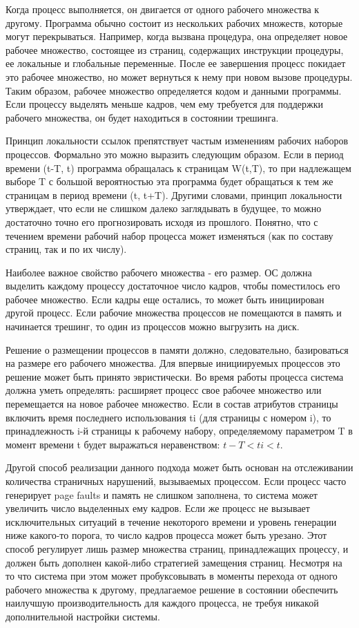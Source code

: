 Когда процесс выполняется, он двигается от одного рабочего множества к другому. Программа обычно состоит из нескольких рабочих множеств, которые могут перекрываться. Hапример, когда вызвана процедура, она определяет новое рабочее множество, состоящее из страниц, содержащих инструкции процедуры, ее локальные и глобальные переменные. После ее завершения процесс покидает это рабочее множество, но может вернуться к нему при новом вызове процедуры. Таким образом, рабочее множество определяется кодом и данными программы. Если процессу выделять меньше кадров, чем ему требуется для поддержки рабочего множества, он будет находиться в состоянии трешинга.

Принцип локальности ссылок препятствует частым изменениям рабочих наборов процессов. Формально это можно выразить следующим образом. Если в период времени (t-T, t) программа обращалась к страницам W(t,T), то при надлежащем выборе T с большой вероятностью эта программа будет обращаться к тем же страницам в период времени (t, t+T). Другими словами, принцип локальности утверждает, что если не слишком далеко заглядывать в будущее, то можно достаточно точно его прогнозировать исходя из прошлого. Понятно, что с течением времени рабочий набор процесса может изменяться (как по составу страниц, так и по их числу).

Наиболее важное свойство рабочего множества - его размер. ОС должна выделить каждому процессу достаточное число кадров, чтобы поместилось его рабочее множество. Если кадры еще остались, то может быть инициирован другой процесс. Если рабочие множества процессов не помещаются в память и начинается трешинг, то один из процессов можно выгрузить на диск.

Решение о размещении процессов в памяти должно, следовательно, базироваться на размере его рабочего множества. Для впервые инициируемых процессов это решение может быть принято эвристически. Во время работы процесса система должна уметь определять: расширяет процесс свое рабочее множество или перемещается на новое рабочее множество. Если в состав атрибутов страницы включить время последнего использования ti (для страницы с номером i), то принадлежность i-й страницы к рабочему набору, определяемому параметром T в момент времени t будет выражаться неравенством: $t-T < ti < t$.

Другой способ реализации данного подхода может быть основан на отслеживании количества страничных нарушений, вызываемых процессом. Если процесс часто генерирует page faults и память не слишком заполнена, то система может увеличить число выделенных ему кадров. Если же процесс не вызывает исключительных ситуаций в течение некоторого времени и уровень генерации ниже какого-то порога, то число кадров процесса может быть урезано. Этот способ регулирует лишь размер множества страниц, принадлежащих процессу, и должен быть дополнен какой-либо стратегией замещения страниц. Несмотря на то что система при этом может пробуксовывать в моменты перехода от одного рабочего множества к другому, предлагаемое решение в состоянии обеспечить наилучшую производительность для каждого процесса, не требуя никакой дополнительной настройки системы.

